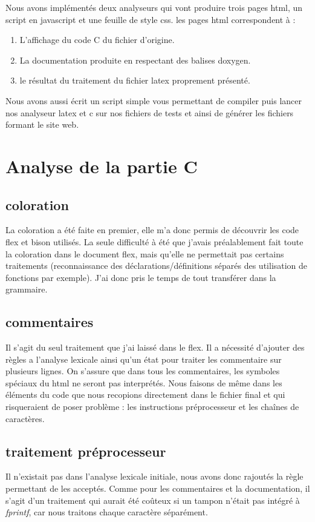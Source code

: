 Nous avons implémentés deux analyseurs qui vont produire trois pages html, un script en javascript et une feuille de style css. les pages html correspondent à : 
\begin{enumerate}
	\item L'affichage du code C du fichier d'origine.
	\item La documentation produite en respectant des balises doxygen.
	\item le résultat du traitement du fichier latex proprement présenté.
\end{enumerate}

Nous avons aussi écrit un script simple vous permettant de compiler puis lancer nos analyseur latex et c sur nos fichiers de tests et ainsi de générer les fichiers formant le site web. \\

\section{Analyse de la partie C}

\subsection{coloration}
La coloration a été faite en premier, elle m'a donc permis de découvrir les code flex et bison utilisés. La seule difficulté à été que j'avais préalablement fait toute la coloration dans le document flex, mais qu'elle ne permettait pas certains traitements (reconnaissance des déclarations/définitions séparés des utilisation de fonctions par exemple). J'ai donc pris le temps de tout transférer dans la grammaire. 

\subsection{commentaires}
Il s'agit du seul traitement que j'ai laissé dans le flex. Il a nécessité d'ajouter des règles a l'analyse lexicale ainsi qu'un état pour traiter les commentaire sur plusieurs lignes. \newline
On s'assure que dans tous les commentaires, les symboles spéciaux du html ne seront pas interprétés. Nous faisons de même dans les éléments du code que nous recopions directement dans le fichier final et qui risqueraient de poser problème : les instructions préprocesseur et les chaînes de caractères.

\subsection{traitement préprocesseur}
Il n'existait pas dans l'analyse lexicale initiale, nous avons donc rajoutés la règle permettant de les acceptés. Comme pour les commentaires et la documentation, il s'agit d'un traitement qui aurait été coûteux si un tampon n'était pas intégré à \textit{fprintf}, car nous traitons chaque caractère séparément. 

